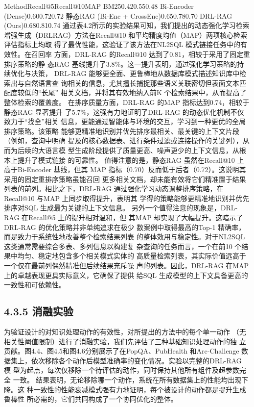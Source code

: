 \documentclass[12pt,a4paper,openright,UTF8]{ctexbook}
\begin{document}
MethodRecall@5Recall@10MAP BM250.420.550.48 Bi-Encoder (Dense)0.600.720.72 静态RAG (Bi-Enc + CrossEnc)0.650.780.70 DRL-RAG (Ours)0.680.810.74 通过表4.2所示的实验结果可知，我们提出的动态强化学习检索增强生成（DRLRAG）方法在Recall@10 和平均精度均值（MAP）两项核心检索评估指标上均取 得了最优性能，这验证了该方法在NL2SQL 模式链接任务中的有效性。在召回率 方面，DRL-RAG 的Recall@10 达到了0.81，相较于采用了固定重排序策略的静 态RAG 基线提升了3.8\%。这一提升表明，通过强化学习策略的持续优化与决策， DRL-RAG 能够更全面、更鲁棒地从数据库模式描述知识库中检索出与自然语言查 询相关的信息，尤其擅长捕捉那些语义关联密切但表面文本匹配度较低的“长尾” 相关文档，并将其有效地纳入前K 个检索结果中，从而提高了整体检索的覆盖度。 在排序质量方面，DRL-RAG 的MAP 指标达到0.74，相较于静态RAG 显著提升 了5.7\%，这强有力地证明了DRL-RAG 的动态优化机制不仅致力于“找全”相关 信息，更能通过智能体与环境的交互，学习到一种更优的全局排序策略。该策略 能够更精准地识别并优先排序最相关、最关键的上下文片段（例如，查询中明确 提及的核心数据表、进行条件过滤或连接操作的关键列），从而为后续的大语言模 型生成阶段提供了质量更高、噪声更少的上下文信息，从根本上提升了模式链接 的可靠性。 值得注意的是，静态RAG 虽然在Recall@10 上高于Bi-Encoder 基线，但其 MAP 指标（0.70）反而低于后者（0.72）。这说明其采用的固定重排序策略虽能召回 更多相关文档，却未能有效将它们精准置于结果列表的前列。相比之下，DRL-RAG 通过强化学习动态调整排序策略，在Recall@10 与MAP 上同步取得提升，表明其 学得的策略能够更精准地识别并优先排序对SQL 生成最为关键的上下文信息。 另外一个值得注意的现象是，DRL-RAG 在Recall@5 上的提升相对温和，但 其MAP 却实现了大幅提升。这暗示了DRL-RAG 的优化策略并非单纯追求在极少 数案例中取得最高的Top-1 精确率，而是致力于系统性地改善整个检索结果列表 的整体效用与稳定性。对于NL2SQL 这类通常需要综合多表、多列信息以构建复 杂查询的任务而言，一个在前10 个结果中均匀、稳定地包含多个相关模式实体的 高质量检索列表，其实际价值远高于一个仅在最前列偶然精准但后续结果充斥噪 声的列表。因此，DRL-RAG 在MAP 上的卓越表现更具实际意义，它确保了提供 给SQL 生成模型的上下文具备更高的一致性和可依赖性。

\subsection{4.3.5 消融实验}

为验证设计的对知识处理动作的有效性，对所提出的方法中的每个单一动作 （无相关性阈值限制）进行了消融实验，我们先评估了三种基础知识处理动作的独 立贡献。图4.4、图4.5和图4.6分别展示了在PopQA、PubHealth 和Arc-Challenge 数 据集上，依次移除各个动作后模型准确率的变化情况。实验以完整的DRL-RAG 模 型为起点，每次仅移除一个待评估的动作，同时保持其他所有组件及超参数完全 一致。 结果表明，无论移除哪一个动作，系统在所有数据集上的性能均出现下降。这 种一致性的性能衰减模式强有力地证明，每个被设计的动作都是提升生成鲁棒性 所必需的，它们共同构成了一个协同优化的整体。
\end{document}

